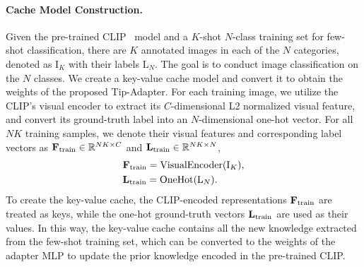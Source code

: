 \documentclass[10pt,twocolumn,letterpaper]{article}
\begin{document}
\paragraph{Cache Model Construction.}
Given the pre-trained CLIP~\cite{radford2021learning} model and a $K$-shot $N$-class training set for few-shot classification, there are $K$ annotated images in each of the $N$ categories, denoted as $\mathrm{I}_{K}$ with their labels $\mathrm{L}_{N}$. The goal is to conduct image classification on the $N$ classes. 
We create a key-value cache model and convert it to obtain the weights of the proposed Tip-Adapter.
For each training image, we utilize the CLIP's visual encoder to extract its $C$-dimensional L2 normalized visual feature, and convert its ground-truth label into an $N$-dimensional one-hot vector. 
For all $NK$ training samples, we denote their visual features and corresponding label vectors as $\mathbf{F}_{\rm train} \in \mathbb{R}^{NK \times C}$ and $\mathbf{L}_{\rm train} \in \mathbb{R}^{NK \times N}$,
\begin{align}
    &\mathbf{F}_{\rm train} = \mathrm{Visual Encoder}(\mathrm{I}_
    {K}),\\
    &\mathbf{L}_{\rm train} = \mathrm{One Hot}(\mathrm{L}_{N}).
\end{align}
To create the key-value cache, the CLIP-encoded representations $\mathbf{F}_{\rm train}$ are treated as keys, while the one-hot ground-truth vectors $\mathbf{L}_{\rm train}$ are used as their values.
In this way, the key-value cache contains all the new knowledge extracted from the few-shot training set, which can be converted to the weights of the adapter MLP to update the prior knowledge encoded in the pre-trained CLIP.
\end{document}

